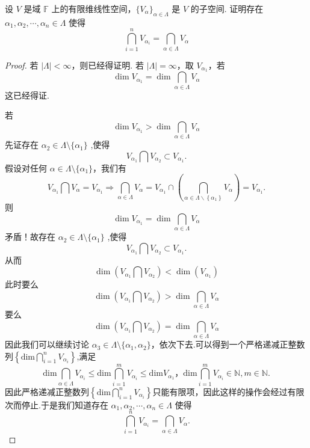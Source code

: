 \documentclass[../../main.tex]{subfiles}%
\begin{document}
\begin{proposition}\label{proposition:无穷多个线性子空间的交等于有限个的交}
设 \( V \) 是域 \( \mathbb{F} \) 上的有限维线性空间，\(\{V_{\alpha}\}_{\alpha \in \Lambda}\) 是 \( V \) 的子空间. 证明存在 \(\alpha_1, \alpha_2, \cdots, \alpha_n \in \Lambda\) 使得
\[
\bigcap_{i = 1}^n V_{\alpha_i} = \bigcap_{\alpha \in \Lambda} V_{\alpha}
\]
\end{proposition}
\begin{proof}
若 \(|\Lambda| < \infty\)，则已经得证明. 若 \(|\Lambda| = \infty\)，取 \(V_{\alpha_1}\)，若
\[
\dim V_{\alpha_1} = \dim \bigcap_{\alpha \in \Lambda} V_{\alpha}
\]
这已经得证.

若
\[
\dim V_{\alpha_1} > \dim \bigcap_{\alpha \in \Lambda} V_{\alpha}
\]
先证存在 \(\alpha_2 \in \Lambda \setminus \{\alpha_1\}\) ,使得
\[
V_{\alpha_1} \bigcap V_{\alpha_2} \subset V_{\alpha_1}.
\]
假设对任何 \(\alpha \in \Lambda \setminus \{\alpha_1\}\)，我们有
\[
V_{\alpha_1} \bigcap V_{\alpha} = V_{\alpha_1}\Longrightarrow \bigcap_{\alpha \in \Lambda}{V_{\alpha}}=V_{\alpha _1}\cap \left( \bigcap_{\alpha \in \Lambda \backslash \left\{ \alpha _1 \right\}}{V_{\alpha}} \right) =V_{\alpha _1}.
\]
则
\[
\dim V_{\alpha_1} = \dim \bigcap_{\alpha \in \Lambda} V_{\alpha}
\]
矛盾！故存在 \(\alpha_2 \in \Lambda \setminus \{\alpha_1\}\) ,使得
\[
V_{\alpha_1} \bigcap V_{\alpha_2} \subset V_{\alpha_1}.
\]
从而
\[
\dim \left( V_{\alpha_1} \bigcap V_{\alpha_2} \right) < \dim \left( V_{\alpha_1} \right)
\]
此时要么
\[
\dim \left( V_{\alpha_1} \bigcap V_{\alpha_2} \right) > \dim \bigcap_{\alpha \in \Lambda} V_{\alpha}
\]
要么
\[
\dim \left( V_{\alpha_1} \bigcap V_{\alpha_2} \right) = \dim \bigcap_{\alpha \in \Lambda} V_{\alpha}
\]
因此我们可以继续讨论 \(\alpha_3 \in \Lambda \setminus \{\alpha_1, \alpha_2\}\)，依次下去.可以得到一个严格递减正整数列$\left\{ \mathrm{dim}\bigcap_{i=1}^n{V_{\alpha _i}} \right\} $,满足
\[
\mathrm{dim}\bigcap_{\alpha \in \Lambda}{V_{\alpha _i}}\leqslant \mathrm{dim}\bigcap_{i=1}^m{V_{\alpha _i}}\leqslant \mathrm{dim}V_{\alpha _1}，\mathrm{dim}\bigcap_{i=1}^m{V_{\alpha _i}}\in \mathbb{N},m\in \mathbb{N}.
\]
因此严格递减正整数列$\left\{ \mathrm{dim}\bigcap_{i=1}^n{V_{\alpha _i}} \right\}$只能有限项，因此这样的操作会经过有限次而停止.于是我们知道存在 \(\alpha_1, \alpha_2, \cdots, \alpha_n \in \Lambda\) 使得
\[
\bigcap_{i = 1}^n V_{\alpha_i} = \bigcap_{\alpha \in \Lambda} V_{\alpha}.
\]
\end{proof}
\end{document}
